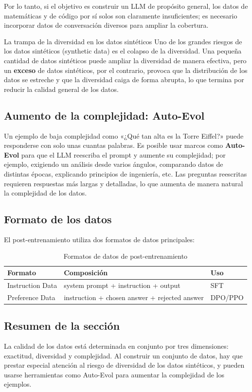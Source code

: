 Por lo tanto, si el objetivo es construir un LLM de propósito general, los datos de matemáticas y de código por sí solos son claramente insuficientes; es necesario incorporar datos de conversación diversos para ampliar la cobertura.

\begin{warningbox}{La trampa de la diversidad en los datos sintéticos}
Uno de los grandes riesgos de los datos sintéticos (synthetic data) es el colapso de la diversidad. Una pequeña cantidad de datos sintéticos puede ampliar la diversidad de manera efectiva, pero un \textbf{exceso} de datos sintéticos, por el contrario, provoca que la distribución de los datos se estreche y que la diversidad caiga de forma abrupta, lo que termina por reducir la calidad general de los datos.
\end{warningbox}

\subsection{Aumento de la complejidad: Auto-Evol}

Un ejemplo de baja complejidad como «¿Qué tan alta es la Torre Eiffel?» puede responderse con solo unas cuantas palabras. Es posible usar marcos como \textbf{Auto-Evol} para que el LLM reescriba el prompt y aumente su complejidad; por ejemplo, exigiendo un análisis desde varios ángulos, comparando datos de distintas épocas, explicando principios de ingeniería, etc. Las preguntas reescritas requieren respuestas más largas y detalladas, lo que aumenta de manera natural la complejidad de los datos.

\subsection{Formato de los datos}

El post-entrenamiento utiliza dos formatos de datos principales:

\begin{table}[H]
\centering
\caption{Formatos de datos de post-entrenamiento}
\begin{tabular}{lll}
\toprule
\textbf{Formato} & \textbf{Composición} & \textbf{Uso} \\
\midrule
Instruction Data & system prompt + instruction + output & SFT \\
Preference Data & instruction + chosen answer + rejected answer & DPO/PPO \\
\bottomrule
\end{tabular}
\end{table}

\subsection{Resumen de la sección}

La calidad de los datos está determinada en conjunto por tres dimensiones: exactitud, diversidad y complejidad. Al construir un conjunto de datos, hay que prestar especial atención al riesgo de diversidad de los datos sintéticos, y pueden usarse herramientas como Auto-Evol para aumentar la complejidad de los ejemplos.

\newpage
